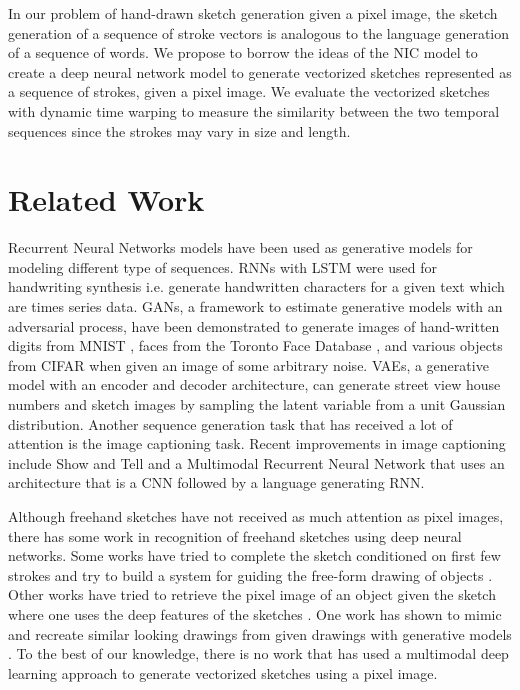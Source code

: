 \documentclass{article}
\begin{document}
In our problem of hand-drawn sketch generation given a pixel image, the sketch generation of a sequence of stroke vectors is analogous to the language generation of a sequence of words. We propose to borrow the ideas of the NIC model to create a deep neural network model to generate vectorized sketches represented as a sequence of strokes, given a pixel image. We evaluate the vectorized sketches with dynamic time warping to measure the similarity between the two temporal sequences since the strokes may vary in size and length.


\section{Related Work}

Recurrent Neural Networks models have been used as generative models for modeling different type of sequences. RNNs with LSTM were used for handwriting synthesis i.e. generate handwritten characters for a given text \cite{DBLP:journals/corr/Graves13} which are times series data. GANs, a framework to estimate generative models with an adversarial process, have been demonstrated to generate images of hand-written digits from MNIST \cite{MNIST}, faces from the Toronto Face Database \cite{TFD}, and various objects from CIFAR \cite{CIFAR} when given an image of some arbitrary noise. VAEs, a generative model with an encoder and decoder architecture, can generate street view house numbers \cite{DBLP:journals/corr/GregorDGW15} and sketch images \cite{qdpaper} by sampling the latent variable from a unit Gaussian distribution. Another sequence generation task that has received a lot of attention is the image captioning task. Recent improvements in image captioning include Show and Tell \cite{DBLP:journals/corr/VinyalsTBE14} and a Multimodal Recurrent Neural Network \cite{DBLP:journals/corr/KarpathyF14} that uses an architecture that is a CNN followed by a language generating RNN.

Although freehand sketches have not received as much attention as pixel images, there has some work in recognition of freehand sketches using deep neural networks. Some works have tried to complete the sketch conditioned on first few strokes and try to build a system for guiding the free-form drawing of objects \cite{qdpaper} \cite{rcp2}. Other works have tried to retrieve the pixel image of an object given the sketch \cite{sketchydb} where one uses the deep features of the sketches \cite{rcp1}. One work has shown to mimic and recreate similar looking drawings from given drawings with generative models \cite{qdpaper}. To the best of our knowledge, there is no work that has used a multimodal deep learning approach to generate vectorized sketches using a pixel image.
\end{document}
